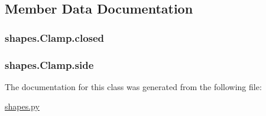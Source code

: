 \subsection{Member Data Documentation}
\hypertarget{classshapes_1_1_clamp_ae1c518e15eb0c86290d5fd8bb83fab77}{}
\subsubsection[{closed}]{\setlength{\rightskip}{0pt plus 5cm}shapes.\+Clamp.\+closed}\label{classshapes_1_1_clamp_ae1c518e15eb0c86290d5fd8bb83fab77}
\hypertarget{classshapes_1_1_clamp_a0c179c90d96f3c2b5e28723c6894fcef}{}
\subsubsection[{side}]{\setlength{\rightskip}{0pt plus 5cm}shapes.\+Clamp.\+side}\label{classshapes_1_1_clamp_a0c179c90d96f3c2b5e28723c6894fcef}


The documentation for this class was generated from the following file\+:\begin{DoxyCompactItemize}
\item 
\hyperlink{shapes_8py}{shapes.\+py}\end{DoxyCompactItemize}
